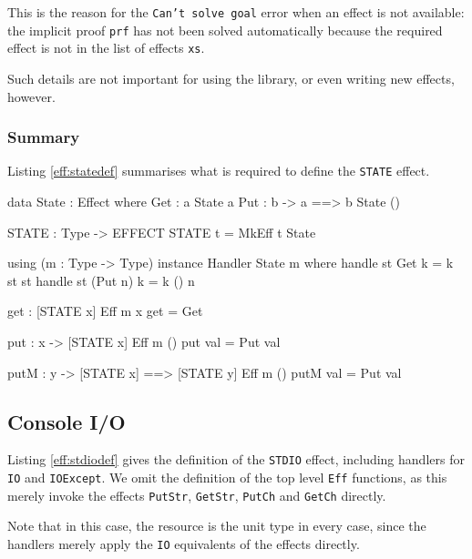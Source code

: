 \noindent
This is the reason for the \texttt{Can't solve goal} error when an effect is
not available: the implicit proof \texttt{prf} has not been solved automatically
because the required effect is not in the list of effects \texttt{xs}.

Such details are not important for using the library, or even writing new
effects, however. 

\subsubsection*{Summary}

Listing \ref{eff:statedef} summarises what is required to define the
\texttt{STATE} effect.

\begin{code}[float=h,frame=single, caption={Complete State Effect Definition}, label=eff:statedef]
data State : Effect where
     Get :      { a }       State a
     Put : b -> { a ==> b } State () 

STATE : Type -> EFFECT
STATE t = MkEff t State

using (m : Type -> Type)
  instance Handler State m where
     handle st Get     k = k st st
     handle st (Put n) k = k () n

get : { [STATE x] } Eff m x
get = Get

put : x -> { [STATE x] } Eff m () 
put val = Put val

putM : y -> { [STATE x] ==> [STATE y] } Eff m () 
putM val = Put val
\end{code}

\subsection{Console I/O}

Listing \ref{eff:stdiodef} gives the definition of the
\texttt{STDIO} effect, including handlers for \texttt{IO} and
\texttt{IOExcept}. We omit the definition of the top level \texttt{Eff}
functions, as this merely invoke the effects \texttt{PutStr}, \texttt{GetStr},
\texttt{PutCh} and \texttt{GetCh} directly.

Note that in this case, the resource is the unit type in every case, since
the handlers merely apply the \texttt{IO} equivalents of the effects
directly.

